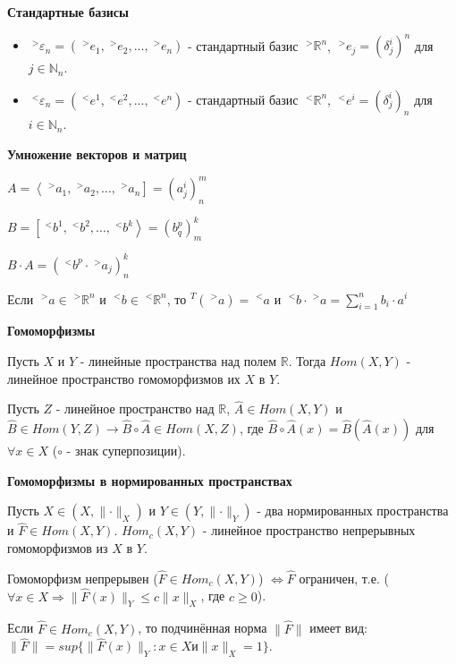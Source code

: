 \documentclass[__main__.tex]{subfiles}
\begin{document}
\textbf{Стандартные базисы}

\begin{itemize}
    \item
          $\;^{>}\varepsilon_n = (\;^{>}e_1, \;^{>}e_2, ... , \;^{>}e_n)$ - стандартный базис $\;^{>}\mathbb{R}^n$, $\;^{>}e_j = (\delta^i_j)^n$ для $j \in \mathbb{N}_n$.

    \item
          $\;^{<}\varepsilon_n = (\;^{<}e^1, \;^{<}e^2, ... , \;^{<}e^n)$ - стандартный базис $\;^{<}\mathbb{R}^n$, $\;^{<}e^i = (\delta^i_j)_n$ для $i \in \mathbb{N}_n$.
\end{itemize}

\textbf{Умножение векторов и матриц}

$A = \left< \;^{>}a_1, \;^{>}a_2, ... , \;^{>}a_n \right] = (a^i_j)^m_n$

$B = \left[ \;^{<}b^1, \;^{<}b^2, ... , \;^{<}b^k \right> = (b^p_q)^k_m$

$B \cdot A = (\;^{<}b^p \cdot \;^{>}a_j)^k_n$

Если $\;^{>}a \in \;^{>}\mathbb{R}^n$ и $\;^{<}b \in \;^{<}\mathbb{R}^n$, то $^{T}(\;^{>}a) = \;^{<}a$ и $\;^{<}b \cdot \;^{>}a = \sum_{i = 1}^{n} b_i \cdot a^i$

\textbf{Гомоморфизмы}

Пусть $X$ и $Y$ - линейные пространства над полем $\mathbb{R}$. Тогда $Hom(X,Y)$ - линейное пространство гомоморфизмов их $X$ в $Y$.

Пусть $Z$ - линейное пространство над $\mathbb{R}$, $\hat{A} \in Hom(X,Y)$ и $\hat{B} \in Hom(Y,Z) \rightarrow \hat{B} \circ \hat{A} \in Hom (X,Z)$, где $\hat{B} \circ \hat{A} (x) = \hat{B}(\hat{A}(x))$ для $\forall x \in X$ ($\circ$ - знак суперпозиции).

\textbf{Гомоморфизмы в нормированных пространствах}

Пусть $X \in (X, \lVert \cdot \rVert_X)$ и $Y \in (Y, \lVert \cdot \rVert_Y)$ - два нормированных пространства и $\hat{F} \in Hom(X,Y)$. $Hom_c(X,Y)$ - линейное пространство непрерывных гомоморфизмов из $X$ в $Y$.

\begin{statement}
    Гомоморфизм непрерывен ($\hat{F} \in Hom_c(X,Y)$) $\Leftrightarrow \hat{F}$ ограничен, т.е. ($\forall x \in X \Rightarrow \lVert \hat{F}(x) \rVert_Y \leqslant c \lVert x \rVert_X$, где $c \geqslant 0$).
\end{statement}

\begin{definition}
    Если $\hat{F} \in Hom_c(X,Y)$, то подчинённая норма $\lVert \hat{F} \rVert$ имеет вид: $\lVert \hat{F} \rVert = sup \lbrace \lVert \hat{F}(x) \rVert_Y : x \in X и \lVert x \rVert_X = 1 \rbrace$.
\end{definition}
\end{document}
